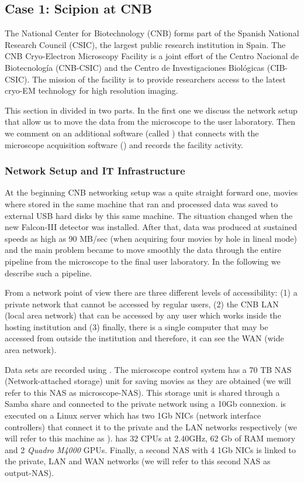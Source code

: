 \subsection{Case 1: Scipion at CNB}
The National Center for Biotechnology (CNB) forms part of the Spanish National Research Council (CSIC), the largest public research institution in Spain. 
The CNB Cryo-Electron Microscopy Facility is a joint effort of the Centro Nacional de Biotecnolog\'{i}a (CNB-CSIC) and the Centro de Investigaciones Biol\'{o}gicas (CIB-CSIC). The mission of the facility is to provide researchers access to the latest cryo-EM technology for high resolution imaging. 

This section in divided in two parts. In the first one we discuss the network setup that allow us to move the data from the microscope to the user laboratory. Then  we comment on an additional software (called  \emadmin) that connects \scipion with the microscope acquisition software (\epu) and records the facility activity.

\subsubsection{Network Setup and IT Infrastructure}

At the beginning CNB networking setup was a quite straight forward one, movies where stored in the  same machine that ran \scipion and processed data was saved to external USB hard disks by this same machine. The situation changed when the new Falcon-III detector was installed. After that, data was produced at sustained speeds as high as 90 MB/sec (when acquiring four movies by hole in lineal mode) and the main problem became to move smoothly the data through the entire pipeline from the microscope to the final user laboratory. In the following we describe such a pipeline.

From a network point of view there are three different levels of accessibility: (1) a private network that cannot be accessed by regular users, (2) the CNB LAN (local area network)  that can be accessed by any user which works inside the hosting  institution and (3) finally, there is a single computer that may be accessed from outside the institution and therefore, it can see the WAN (wide area network).

Data sets are recorded using \epu. The microscope control system has a 70 TB NAS (Network-attached storage) unit for saving movies as they are obtained (we will refer to this NAS as microscope-NAS). This storage unit is shared through a Samba share and connected to the private network using a 10Gb connexion. \scipion is executed on a Linux server which has two 1Gb NICs (network interface controllers) that connect it to the private and the LAN networks respectively (we will refer to this machine as \scipionbox). \scipionbox has 32 CPUs at 2.40GHz, 62 Gb of RAM memory and 2 \textit{Quadro M4000} GPUs. Finally, a second NAS with 4 1Gb NICs is linked to the private, LAN and WAN networks (we will refer to this second NAS as output-NAS).

